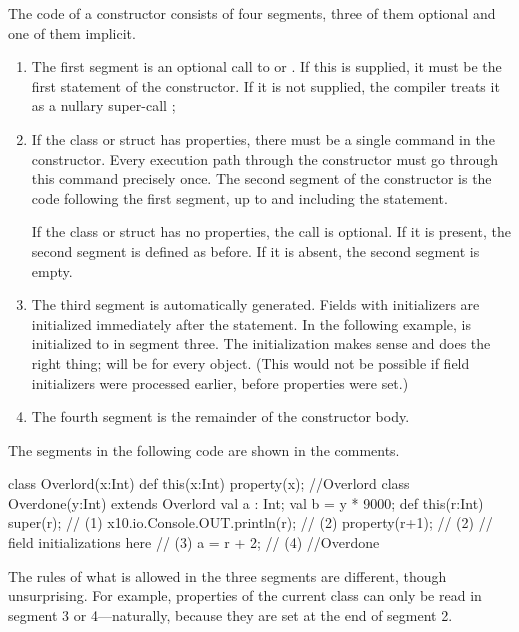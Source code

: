 The code of a constructor consists of four segments, three of them optional
and one of them implicit.
\begin{enumerate}
\item The first segment is an optional call to  or
      .  If this is supplied, it must be the first statement
      of the constructor.  If it is not supplied, the compiler treats it as a
      nullary super-call ;
\item If the class or struct has properties, there must be a single
       command in the constructor.  Every execution path
      through the constructor must go through this  command
      precisely once.   The second segment of the constructor is the code
      following the first segment, up to and including the 
      statement.  

      If the class or struct has no properties, the  call is
      optional. If it is present, the second segment is defined as before.  If
      it is absent, the second segment is empty.
\item The third segment is automatically generated.  Fields with initializers
      are initialized immediately after the  statement.  
      In the following example,  is initialized to  in
      segment three.  The initialization makes sense and does the right
      thing;  will be  for every  object. 
      (This would not be possible if field initializers were processed
      earlier, before properties were set.)
\item The fourth segment is the remainder of the constructor body.
\end{enumerate}

The segments in the following code are shown in the comments.
\begin{xten}
class Overlord(x:Int) {
  def this(x:Int) { property(x); }
}//Overlord
class Overdone(y:Int) extends Overlord  {
  val a : Int;
  val b =  y * 9000;
  def this(r:Int) {
    super(r);                      // (1)
    x10.io.Console.OUT.println(r); // (2)
    property(r+1);                 // (2)
    // field initializations here  // (3)
    a = r + 2;                     // (4)
  }
}//Overdone
\end{xten}
%

The rules of what is allowed in the three segments are different, though
unsurprising.  For example, properties of the current class can only be read
in segment 3 or 4---naturally, because they are set at the end of segment 2.  

